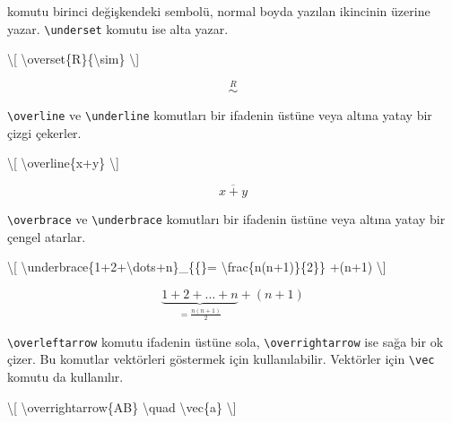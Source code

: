 \documentclass[
  10pt,
]{scrbook}
\newenvironment{Shaded}{}{}
\newcommand{\SpecialCharTok}[1]{\textcolor[rgb]{0.25,0.44,0.63}{#1}}
\newcommand{\SpecialStringTok}[1]{\textcolor[rgb]{0.73,0.40,0.53}{#1}}
\theoremstyle{definition}
\theoremstyle{definition}
\theoremstyle{definition}
\theoremstyle{definition}
\theoremstyle{remark}
\begin{document}
komutu birinci değişkendeki sembolü, normal boyda yazılan ikincinin üzerine yazar. \texttt{\textbackslash{}underset} komutu ise alta yazar.

\begin{Shaded}
\begin{Highlighting}[]
\SpecialStringTok{\textbackslash{}[}
\SpecialCharTok{\textbackslash{}overset}\SpecialStringTok{\{R\}\{}\SpecialCharTok{\textbackslash{}sim}\SpecialStringTok{\}}
\SpecialStringTok{\textbackslash{}]}
\end{Highlighting}
\end{Shaded}

\[
\overset{R}{\sim}
\]

\texttt{\textbackslash{}overline} ve \texttt{\textbackslash{}underline} komutları bir ifadenin üstüne veya altına yatay bir çizgi çekerler.

\begin{Shaded}
\begin{Highlighting}[]
\SpecialStringTok{\textbackslash{}[}
\SpecialCharTok{\textbackslash{}overline}\SpecialStringTok{\{x+y\}}
\SpecialStringTok{\textbackslash{}]}
\end{Highlighting}
\end{Shaded}

\[
\overline{x+y}
\]

\texttt{\textbackslash{}overbrace} ve \texttt{\textbackslash{}underbrace} komutları bir ifadenin üstüne veya altına yatay bir çengel atarlar.

\begin{Shaded}
\begin{Highlighting}[]
\SpecialStringTok{\textbackslash{}[}
\SpecialCharTok{\textbackslash{}underbrace}\SpecialStringTok{\{1+2+}\SpecialCharTok{\textbackslash{}dots}\SpecialStringTok{+n\}\_\{\{\}=}
\SpecialCharTok{\textbackslash{}frac}\SpecialStringTok{\{n(n+1)\}\{2\}\}}
\SpecialStringTok{+(n+1)}
\SpecialStringTok{\textbackslash{}]}
\end{Highlighting}
\end{Shaded}

\[
\underbrace{1+2+\dots+n}_{{}=
\frac{n(n+1)}{2}}
+(n+1)
\]

\texttt{\textbackslash{}overleftarrow} komutu ifadenin üstüne sola, \texttt{\textbackslash{}overrightarrow} ise sağa bir ok çizer. Bu komutlar vektörleri göstermek için kullanılabilir. Vektörler için \texttt{\textbackslash{}vec} komutu da kullanılır.

\begin{Shaded}
\begin{Highlighting}[]
\SpecialStringTok{\textbackslash{}[}
\SpecialCharTok{\textbackslash{}overrightarrow}\SpecialStringTok{\{AB\} }\SpecialCharTok{\textbackslash{}quad}\SpecialStringTok{ }\SpecialCharTok{\textbackslash{}vec}\SpecialStringTok{\{a\}}
\SpecialStringTok{\textbackslash{}]}
\end{Highlighting}
\end{Shaded}
\end{document}

